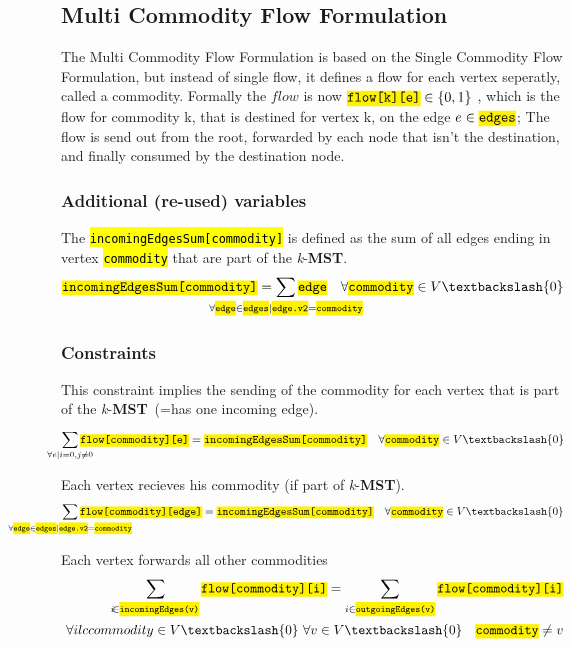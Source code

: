 \documentclass[,%
			paper=a4,%
			DIV14,
			liststotoc,
			bibtotoc,
			draft=false,%
			numbers=noendperiod
			]{scrartcl}
\newcommand{\mst}{\textbf{MST}}
\newcommand{\kmst}{\textit{k}-\mst}
\newcommand{\ilc}[1]{\hl{\texttt{#1}}} %
\begin{document}
\subsection{Multi Commodity Flow Formulation}
The Multi Commodity Flow Formulation is based on the Single Commodity Flow Formulation, but instead of single flow, it defines a flow for each vertex seperatly, called a commodity. Formally the $flow$ is now $\ilc{flow[k][e]} \in \left\{0,1\right\}$ , which is the flow for commodity k, that is destined for vertex k, on the edge $e \in \ilc{edges}$; The flow is send out from the root, forwarded by each node that isn't the destination, and finally consumed by the destination node.

\subsubsection{Additional (re-used) variables}
The \ilc{incomingEdgesSum[commodity]} is defined as the sum of all edges ending in vertex \ilc{commodity} that are part of the \kmst.
\begin{equation}\label{eq:mfcInEdges}
	\ilc{incomingEdgesSum[commodity]} = \sum_{\mathclap{\forall \ilc{edge} \in \ilc{edges} | \ilc{edge.v2} = \ilc{commodity}}} \ilc{edge} 
\quad \forall \ilc{commodity} \in V \textbackslash \{0\}
\end{equation}


\subsubsection{Constraints}

This constraint implies the sending of the commodity for each vertex that is part of the \kmst\ (=has one incoming edge).
\begin{equation}\label{eq:mfcSend}
	\sum_{\mathclap{\forall e|i=0, j \neq 0}}^{} \ilc{flow[commodity][e]} = \ilc{incomingEdgesSum[commodity]}
\quad \forall \ilc{commodity} \in V  \textbackslash \{0\}
\end{equation}

Each vertex recieves his commodity (if part of \kmst).
\begin{equation}\label{eq:mfcRec}
	  \sum_{\mathclap{\forall \ilc{edge} \in \ilc{edges}| \ilc{edge.v2} = \ilc{commodity}}} \ilc{flow[commodity][edge]} 
 = \ilc{incomingEdgesSum[commodity]}
\quad \forall \ilc{commodity} \in V  \textbackslash \{0\}
\end{equation}

Each vertex forwards all other commodities
\begin{equation}\label{eq:mfcForward}
\begin{split}
\sum_{\mathclap i \in \ilc{incomingEdges(v)}} \ilc{flow[commodity][i]} = \sum_{ i \in \ilc{outgoingEdges(v)}} \ilc{flow[commodity][i]} \\
\ \forall ilc{commodity} \in V  \textbackslash \{0\}
\ \forall v \in V  \textbackslash \{0\}
\quad \ilc{commodity} \neq v
\end{split}
\end{equation}
\end{document}
